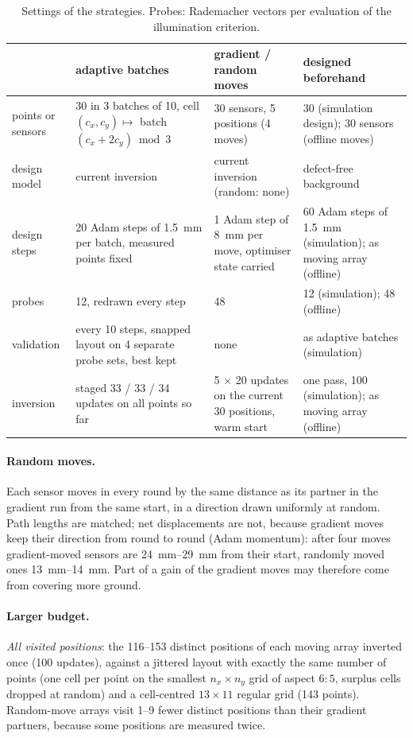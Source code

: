 \begin{table}[ht]\centering\small
\caption{Settings of the strategies. Probes: Rademacher vectors per evaluation of the illumination criterion.}
\label{tab:settings}
\begin{tabularx}{\linewidth}{@{}l X X X@{}}
\toprule
 & adaptive batches & gradient / random moves & designed beforehand \\ \midrule
points or sensors & 30 in 3 batches of 10, cell $(c_x,c_y)\mapsto$ batch $(c_x+2c_y)\bmod 3$ & 30 sensors, 5 positions (4 moves) & 30 (simulation design); 30 sensors (offline moves) \\
design model & current inversion & current inversion (random: none) & defect-free background \\
design steps & 20 Adam steps of \SI{1.5}{mm} per batch, measured points fixed & 1 Adam step of \SI{8}{mm} per move, optimiser state carried & 60 Adam steps of \SI{1.5}{mm} (simulation); as moving array (offline) \\
probes & 12, redrawn every step & 48 & 12 (simulation); 48 (offline) \\
validation & every 10 steps, snapped layout on 4 separate probe sets, best kept & none & as adaptive batches (simulation) \\
inversion & staged 33 / 33 / 34 updates on all points so far & 5 $\times$ 20 updates on the current 30 positions, warm start & one pass, 100 (simulation); as moving array (offline) \\
\bottomrule
\end{tabularx}
\end{table}

\paragraph{Random moves.} Each sensor moves in every round by the same distance as its partner in the gradient run
from the same start, in a direction drawn uniformly at random. Path lengths are matched; net displacements are not,
because gradient moves keep their direction from round to round (Adam momentum): after four moves gradient-moved
sensors are \SIrange{24}{29}{mm} from their start, randomly moved ones \SIrange{13}{14}{mm}. Part of a gain of the
gradient moves may therefore come from covering more ground.

\paragraph{Larger budget.} \emph{All visited positions}: the 116--153 distinct positions of each moving array
inverted once (100 updates), against a jittered layout with exactly the same number of points (one cell per point
on the smallest $n_x\times n_y$ grid of aspect $6{:}5$, surplus cells dropped at random) and a cell-centred
$13\times11$ regular grid (143 points). Random-move arrays visit 1--9 fewer distinct positions than their gradient
partners, because some positions are measured twice.

